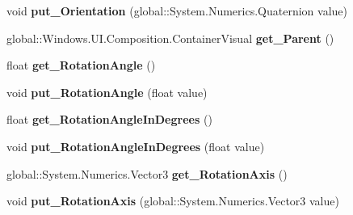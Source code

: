 \begin{DoxyCompactItemize}
\mbox{\label{interface_windows_1_1_u_i_1_1_composition_1_1_i_visual_ac0ab83605b6773e888073ad16337ad3f}} 
void {\bfseries put\+\_\+\+Orientation} (global\+::\+System.\+Numerics.\+Quaternion value)
\item 
\mbox{\label{interface_windows_1_1_u_i_1_1_composition_1_1_i_visual_a134bed2c4c5639f5afd9a8ea755bd39a}} 
global\+::\+Windows.\+U\+I.\+Composition.\+Container\+Visual {\bfseries get\+\_\+\+Parent} ()
\item 
\mbox{\label{interface_windows_1_1_u_i_1_1_composition_1_1_i_visual_abefcdbefc02e45c1a846f29a0b173f5d}} 
float {\bfseries get\+\_\+\+Rotation\+Angle} ()
\item 
\mbox{\label{interface_windows_1_1_u_i_1_1_composition_1_1_i_visual_a57dea19f8a26f8727219fb97a7df55e7}} 
void {\bfseries put\+\_\+\+Rotation\+Angle} (float value)
\item 
\mbox{\label{interface_windows_1_1_u_i_1_1_composition_1_1_i_visual_aff19cf9eed640a1a17a06464d5ccc102}} 
float {\bfseries get\+\_\+\+Rotation\+Angle\+In\+Degrees} ()
\item 
\mbox{\label{interface_windows_1_1_u_i_1_1_composition_1_1_i_visual_ab9d2508241cebf4d3bbc2b46c988a77d}} 
void {\bfseries put\+\_\+\+Rotation\+Angle\+In\+Degrees} (float value)
\item 
\mbox{\label{interface_windows_1_1_u_i_1_1_composition_1_1_i_visual_a0fd647734a3c87cddfea98310e1b7406}} 
global\+::\+System.\+Numerics.\+Vector3 {\bfseries get\+\_\+\+Rotation\+Axis} ()
\item 
\mbox{\label{interface_windows_1_1_u_i_1_1_composition_1_1_i_visual_adc180a8a094a1c17218d366727de39d4}} 
void {\bfseries put\+\_\+\+Rotation\+Axis} (global\+::\+System.\+Numerics.\+Vector3 value)
\item 

\end{DoxyCompactItemize}
